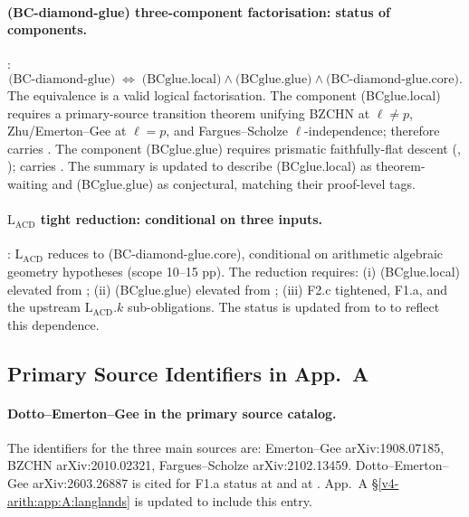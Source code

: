 \paragraph{(BC-diamond-glue) three-component factorisation: status of components.}
 \ClaimStatusProvedHere:
\[
\text{(BC-diamond-glue)}
\;\Leftrightarrow\;
\text{(BCglue.local)} \wedge \text{(BCglue.glue)} \wedge
\text{(BC-diamond-glue.core)}.
\]
The equivalence is a valid logical factorisation. The component
(BCglue.local) requires a primary-source transition theorem unifying
BZCHN at \(\ell\neq p\), Zhu/Emerton--Gee at \(\ell = p\), and
Fargues--Scholze \(\ell\)-independence;
 therefore
carries \ClaimStatusNeedsVerification. The component (BCglue.glue)
requires prismatic faithfully-flat descent
(,
\ClaimStatusConjectured); 
carries \ClaimStatusConjectured. The summary
 is updated to
describe (BCglue.local) as theorem-waiting and (BCglue.glue) as
conjectural, matching their proof-level tags.

\paragraph{\(\mathrm{L}_{\mathrm{ACD}}\) tight reduction: conditional on three inputs.}
 \ClaimStatusConjectured:
\(\mathrm{L}_{\mathrm{ACD}}\) reduces to (BC-diamond-glue.core),
conditional on arithmetic algebraic geometry hypotheses (scope
10--15 pp). The reduction requires: (i) (BCglue.local) elevated
from \ClaimStatusNeedsVerification; (ii) (BCglue.glue) elevated
from \ClaimStatusConjectured; (iii) F2.c tightened, F1.a, and the
upstream \(\mathrm{L}_{\mathrm{ACD}}.k\) sub-obligations. The status
is updated from \ClaimStatusNeedsVerification to
\ClaimStatusConjectured to reflect this dependence.

\subsection{Primary Source Identifiers in App.~A}
\label{v4-arith:w3-audit-A:appA}

\paragraph{Dotto--Emerton--Gee in the primary source catalog.}
The identifiers for the three main sources are:
Emerton--Gee arXiv:1908.07185, BZCHN arXiv:2010.02321,
Fargues--Scholze arXiv:2102.13459.
Dotto--Emerton--Gee arXiv:2603.26887 is cited for F1.a status
at  and at
. App.~A \S\ref{v4-arith:app:A:langlands}
is updated to include this entry.

